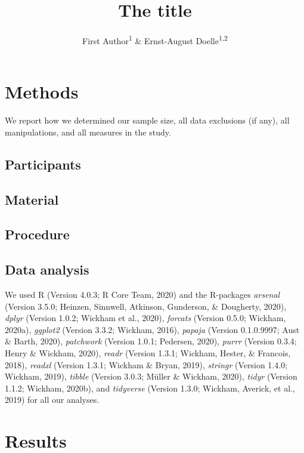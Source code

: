 \documentclass[
  english,
  man]{apa6}
\title{The title}
\author{First Author\textsuperscript{1} \& Ernst-August Doelle\textsuperscript{1,2}}
\date{}
\affiliation{\vspace{0.5cm}\textsuperscript{1} Wilhelm-Wundt-University\\\textsuperscript{2} Konstanz Business School}
\begin{document}
\maketitle

\hypertarget{methods}{%
\section{Methods}\label{methods}}

We report how we determined our sample size, all data exclusions (if any), all manipulations, and all measures in the study.

\hypertarget{participants}{%
\subsection{Participants}\label{participants}}

\hypertarget{material}{%
\subsection{Material}\label{material}}

\hypertarget{procedure}{%
\subsection{Procedure}\label{procedure}}

\hypertarget{data-analysis}{%
\subsection{Data analysis}\label{data-analysis}}

We used R (Version 4.0.3; R Core Team, 2020) and the R-packages \emph{arsenal} (Version 3.5.0; Heinzen, Sinnwell, Atkinson, Gunderson, \& Dougherty, 2020), \emph{dplyr} (Version 1.0.2; Wickham et al., 2020), \emph{forcats} (Version 0.5.0; Wickham, 2020a), \emph{ggplot2} (Version 3.3.2; Wickham, 2016), \emph{papaja} (Version 0.1.0.9997; Aust \& Barth, 2020), \emph{patchwork} (Version 1.0.1; Pedersen, 2020), \emph{purrr} (Version 0.3.4; Henry \& Wickham, 2020), \emph{readr} (Version 1.3.1; Wickham, Hester, \& Francois, 2018), \emph{readxl} (Version 1.3.1; Wickham \& Bryan, 2019), \emph{stringr} (Version 1.4.0; Wickham, 2019), \emph{tibble} (Version 3.0.3; Müller \& Wickham, 2020), \emph{tidyr} (Version 1.1.2; Wickham, 2020b), and \emph{tidyverse} (Version 1.3.0; Wickham, Averick, et al., 2019) for all our analyses.

\hypertarget{results}{%
\section{Results}\label{results}}
\end{document}
